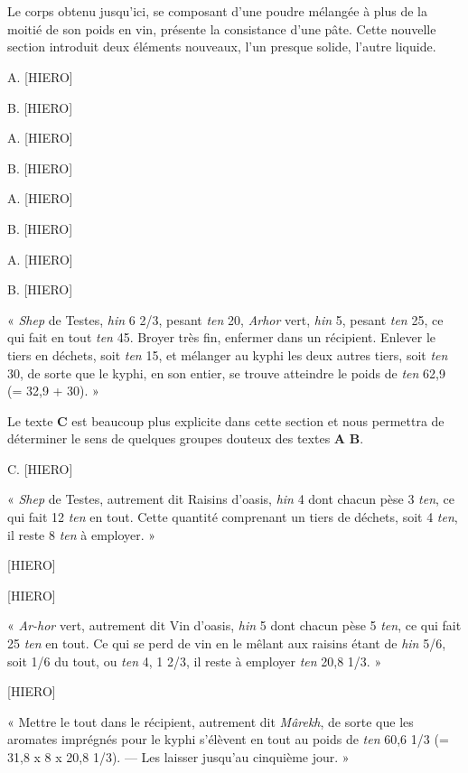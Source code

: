 \documentclass[a4paper, 11pt, oneside]{article}
\begin{document}
\section{}
\paragraph{}
Le corps obtenu jusqu'ici, se composant d'une poudre mélangée à plus de la moitié de son poids en vin, présente la consistance d'une pâte. Cette nouvelle section introduit deux éléments nouveaux, l'un presque solide, l'autre liquide.

A. [HIERO]

B. [HIERO]

A. [HIERO]

B. [HIERO]

A. [HIERO]

B. [HIERO]

A. [HIERO]

B. [HIERO]

« \emph{Shep} de Testes, \emph{hin} 6 2/3, pesant \emph{ten} 20, \emph{Arhor} vert, \emph{hin} 5, pesant \emph{ten} 25, ce qui fait en tout \emph{ten} 45. Broyer très fin, enfermer dans un récipient. Enlever le tiers en déchets, soit \emph{ten} 15, et mélanger au kyphi les deux autres tiers, soit \emph{ten} 30, de sorte que le kyphi, en son entier, se trouve atteindre le poids de \emph{ten} 62,9 (= 32,9 + 30). »

Le texte \textbf{C} est beaucoup plus explicite dans cette section et nous permettra de déterminer le sens de quelques groupes douteux des textes \textbf{A} \textbf{B}.

C. [HIERO]

« \emph{Shep} de Testes, autrement dit Raisins d'oasis, \emph{hin} 4 dont chacun pèse 3 \emph{ten}, ce qui fait 12 \emph{ten} en tout. Cette quantité comprenant un tiers de déchets, soit 4 \emph{ten}, il reste 8 \emph{ten} à employer. »

[HIERO]

[HIERO]

« \emph{Ar-hor} vert, autrement dit Vin d'oasis, \emph{hin} 5 dont chacun pèse 5 \emph{ten}, ce qui fait 25 \emph{ten} en tout. Ce qui se perd de vin en le mêlant aux raisins étant de \emph{hin} 5/6, soit 1/6 du tout, ou \emph{ten} 4, 1 2/3, il reste à employer \emph{ten} 20,8 1/3. »

[HIERO]

« Mettre le tout dans le récipient, autrement dit \emph{Mârekh}, de sorte que les aromates imprégnés pour le kyphi s'élèvent en tout au poids de \emph{ten} 60,6 1/3 (= 31,8 x 8 x 20,8 1/3). --- Les laisser jusqu'au cinquième jour. »
\end{document}

